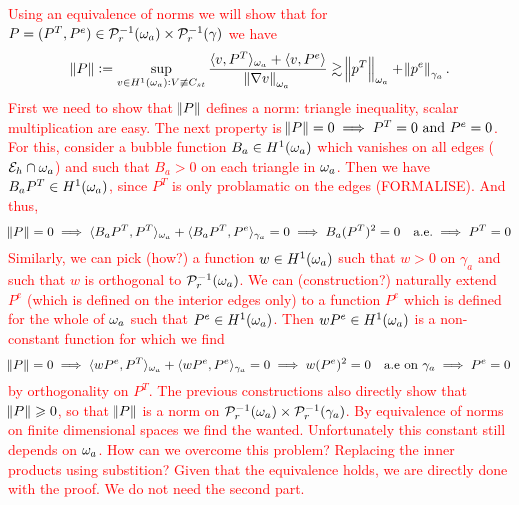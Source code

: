 \documentclass[thesis.tex]{subfiles}
\begin{document}
  \textcolor{red}{
  Using an equivalence of norms we will show that for $P = (P^T, P^e) \in \mathcal{P}_r^{-1}(\omega_a) \times \mathcal{P}_r^{-1}(\gamma)$ we have
    \[
      \|P\| := \sup_{v \in H^1(\omega_a) : V\not \equiv C_{st}} \frac{\langle{v, P^T}\rangle_{\omega_a} + \langle v, P^e \rangle}{\norm{\nabla v}_{\omega_a}} \gtrsim
      \norm{p^T}_{\omega_a} + \norm{p^e}_{\gamma_a}.
    \]
    First we need to show that $\norm{P}$ defines a norm: triangle inequality, scalar multiplication are easy.
    The next property is $\norm{P} = 0 \implies P^T = 0 \text{ and }  P^e = 0$. For this, consider a bubble function $B_a \in H^1(\omega_a)$
    which vanishes on all edges  ($\mathcal{E}_h \cap \omega_a$) and such that $B_a > 0$ on each triangle in $\omega_a$. Then we have $B_a P^T \in H^1(\omega_a)$, since $P^T$ is only problamatic on the edges (FORMALISE). And thus,
    \[
      \norm{P} = 0 \implies \langle{B_aP^T, P^T}\rangle_{\omega_a} + \langle B_aP^T, P^e \rangle_{\gamma_a} = 0 \implies B_a(P^T)^2 = 0\quad\text{a.e.} \implies P^T = 0
    \]
    Similarly, we can pick (how?) a function $w \in H^1(\omega_a)$ such that $w > 0$ on $\gamma_a$ and such that $w$ is orthogonal to $\mathcal{P}_r^{-1}(\omega_a)$.
    We can (construction?) naturally extend $P^e$ (which is defined on the interior edges only) to a function $P^e$ which is defined for the whole of $\omega_a$ such that $P^e \in H^1(\omega_a)$. Then $wP^e \in H^1(\omega_a)$ is a non-constant function for which we find
    \[
      \norm{P} = 0 \implies \langle{wP^e, P^T}\rangle_{\omega_a} + \langle wP^e, P^e \rangle_{\gamma_a}  = 0 \implies w(P^e)^2 = 0 \quad\text{a.e on }\gamma_a \implies P^e = 0
    \]
    by orthogonality on $P^T$.
    The previous constructions also directly show that $\norm{P} \geqslant 0$, so that $\norm{P}$ is a norm on $\mathcal{P}_r^{-1}(\omega_a)\times\mathcal{P}_r^{-1}(\gamma_a)$. By equivalence of norms on finite dimensional spaces we find the wanted. Unfortunately this constant
    still depends on $\omega_a$. How can we overcome this problem? Replacing the inner products using substition?
    Given that the equivalence holds, we are directly done with the proof. We do not need the second part.
  }
\end{document}

